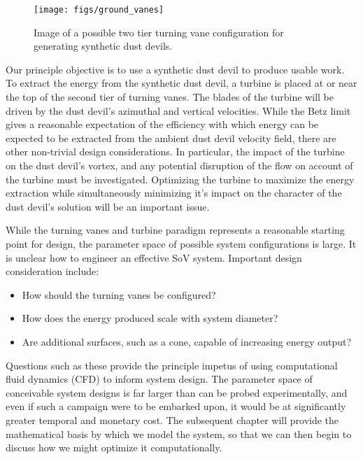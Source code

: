   \begin{figure}[!htb]
    \begin{center}
     \texttt{[image: figs/ground\_vanes]}
     \caption{Image of a possible two tier turning vane 
       configuration for generating synthetic dust devils.}
     \label{fig:cartoon_vanes}
    \end{center}
  \end{figure}


Our principle objective is to use a synthetic dust devil to produce 
usable work. To extract the energy from the synthetic dust
devil, a turbine is placed 
at or near the top of the second tier of turning vanes. 
The blades of the turbine will be driven by the dust devil's azimuthal
and vertical velocities. While the Betz limit\cite{betz} gives a reasonable
expectation of the efficiency with which energy can be expected to be
extracted from the ambient dust devil velocity field, there are other
non-trivial design considerations. In particular, the impact of the
turbine on the dust devil's vortex, and any potential disruption of the
flow on account of the turbine must be investigated. Optimizing the
turbine to maximize the energy extraction while simultaneously
minimizing it's impact on the character of the dust devil's solution
will be an important issue.

While the turning vanes and turbine  
paradigm represents a reasonable starting point for design, the
parameter space of possible system configurations is large. It is
unclear how to engineer an effective SoV system. Important design
consideration include: 
\begin{itemize}
  \item How should the turning vanes be configured?
  \item How does the energy produced scale with system diameter?
  \item Are additional surfaces, such as a cone, capable of increasing energy output?
\end{itemize}

Questions such as these provide the principle impetus of using
computational fluid dynamics (CFD) to inform system design. The
parameter space of conceivable system designs is far larger than can be
probed experimentally, and even if such a campaign were to be embarked
upon, it would be at significantly greater temporal and monetary
cost. The subsequent chapter will provide the mathematical basis by which
we model the system, so that we can then begin to discuss how we might
optimize it computationally.  


